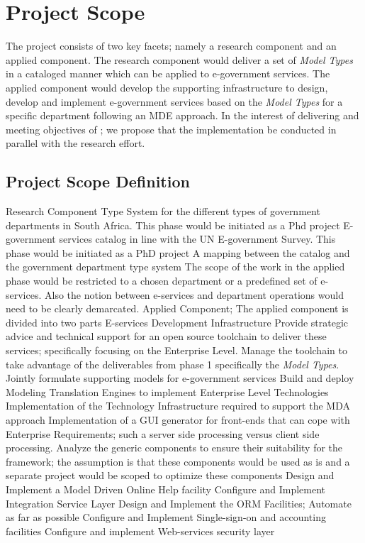 \section{Project Scope}
The project consists of two key facets; namely a research component and an applied component. The research component would deliver a set of \textit{Model Types} in a cataloged manner which can be applied to e-government services.
The applied component would develop the supporting infrastructure to design, develop and implement e-government services based on the \textit{Model Types} for a specific department following an \gls{MDE} approach. In the interest of delivering and meeting objectives of \client; we propose that the implementation be conducted in parallel with the research effort.

\subsection{Project Scope Definition}
\slist
\spit Research Component
\slist
\spit Type System for the different types of government departments in South Africa. This phase would be initiated as a Phd project
\spit E-government services catalog in line with the UN E-government Survey. This phase would be initiated as a PhD project
\spit A mapping between the catalog and the government department type system
\elist
The scope of the work in the applied phase would be restricted to a chosen department or a predefined set of e-services. Also the notion between e-services and department operations would need to be clearly demarcated. 
\spit Applied Component; The applied component is divided into two parts
\slist
\spit E-services Development Infrastructure
\slist
\spit Provide strategic advice and technical support for an open source toolchain to deliver these services; specifically focusing on the Enterprise Level.
\spit Manage the toolchain to take advantage of the deliverables from phase 1 specifically the \textit{Model Types}.
\spit Jointly formulate supporting models for e-government services
\spit Build and deploy Modeling Translation Engines to implement Enterprise Level Technologies 
\elist
\spit Implementation of the Technology Infrastructure required to support the MDA approach
\slist
\spit Implementation of a GUI generator for front-ends that can cope with Enterprise Requirements; such a server side processing versus client side processing.
\spit Analyze the generic components to ensure their suitability for the framework; the assumption is that these components would be used as is and a separate project would be scoped to optimize these components
\spit Design and Implement a Model Driven Online Help facility
\spit Configure and Implement Integration Service Layer
\spit Design and Implement the ORM Facilities; Automate as far as possible
\spit Configure and Implement Single-sign-on and accounting facilities
\spit Configure and implement Web-services security layer
\elist
\elist
\elist
